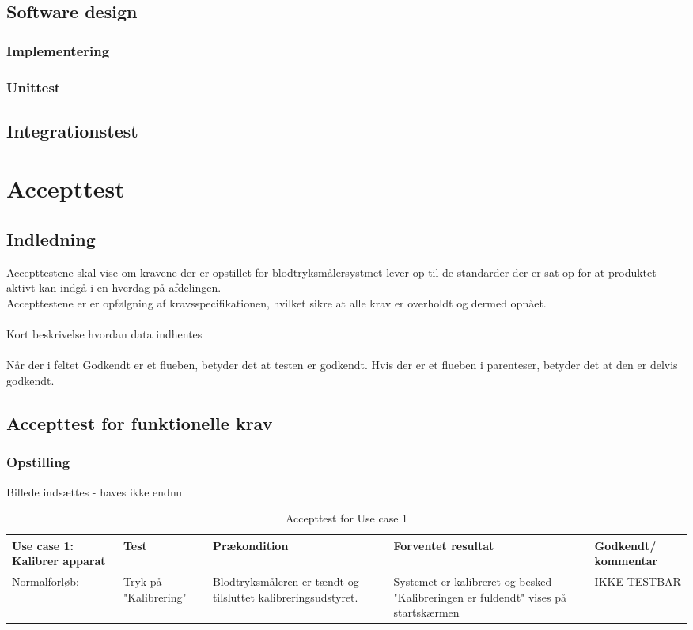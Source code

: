 \section{Software design}
\subsection{Implementering}
\subsection{Unittest}
\section{Integrationstest}
\chapter{Accepttest}
\section{Indledning}
Accepttestene skal vise om kravene der er opstillet for blodtryksmålersystmet lever op til de standarder der er sat op for at produktet aktivt kan indgå i en hverdag på afdelingen.\\
Accepttestene er er opfølgning af kravsspecifikationen, hvilket sikre at alle krav er overholdt og dermed opnået.\\\\
Kort beskrivelse hvordan data indhentes\\\\
Når der i feltet Godkendt er et flueben, betyder det at testen er godkendt. Hvis der er et flueben i parenteser, betyder det at den er delvis godkendt. \\

\section{Accepttest for funktionelle krav}
\subsection{Opstilling}
Billede indsættes - haves ikke endnu

\begin{table}[H]
\caption{Accepttest for Use case 1}\label{tab:tabel8}
\begin{tabular}{|>{\raggedright\arraybackslash}p{2.5cm}| >{\raggedright\arraybackslash}p{2.9cm} | >{\raggedright\arraybackslash}p{2.9cm} | >{\raggedright\arraybackslash}p{2.9cm} | >{\raggedright\arraybackslash}p{2.8cm} |}
   \hline
   \textbf{Use case 1: Kalibrer apparat} &\textbf{Test}& \textbf{Prækondition} & \textbf{Forventet resultat} & \textbf{Godkendt/ kommentar}\\ \hline
   Normalforløb:& Tryk på "Kalibrering" & Blodtryksmåleren er tændt og tilsluttet kalibreringsudstyret. & Systemet er kalibreret og besked "Kalibreringen er fuldendt" vises på startskærmen & IKKE TESTBAR\\\hline
\end{tabular}
\end{table}


